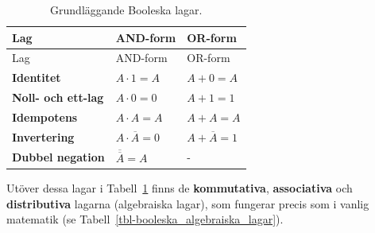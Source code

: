 \documentclass[
  swedish,
  letterpaper,
  oneside,
  openany]{book}
\begin{document}
\begin{longtable}[]{@{}
  >{\raggedright\arraybackslash}p{}
  >{\raggedright\arraybackslash}p{}
  >{\raggedright\arraybackslash}p{}@{}}
\caption{Grundläggande Booleska
lagar.}\label{tbl-booleska_grundlagar}\tabularnewline
\toprule\noalign{}
\begin{minipage}[b]{\linewidth}\raggedright
Lag
\end{minipage} & \begin{minipage}[b]{\linewidth}\raggedright
AND-form
\end{minipage} & \begin{minipage}[b]{\linewidth}\raggedright
OR-form
\end{minipage} \\
\midrule\noalign{}
\endfirsthead
\toprule\noalign{}
\begin{minipage}[b]{\linewidth}\raggedright
Lag
\end{minipage} & \begin{minipage}[b]{\linewidth}\raggedright
AND-form
\end{minipage} & \begin{minipage}[b]{\linewidth}\raggedright
OR-form
\end{minipage} \\
\midrule\noalign{}
\endhead
\bottomrule\noalign{}
\endlastfoot
\textbf{Identitet} & \(A \cdot 1 = A\) & \(A + 0 = A\) \\
\textbf{Noll- och ett-lag} & \(A \cdot 0 = 0\) & \(A + 1 = 1\) \\
\textbf{Idempotens} & \(A \cdot A = A\) & \(A + A = A\) \\
\textbf{Invertering} & \(A \cdot \overline{A} = 0\) &
\(A + \overline{A} = 1\) \\
\textbf{Dubbel negation} & \(\overline{\overline{A}} = A\) & - \\
\end{longtable}

Utöver dessa lagar i Tabell~\ref{tbl-booleska_grundlagar} finns de
\textbf{kommutativa}, \textbf{associativa} och \textbf{distributiva}
lagarna (algebraiska lagar), som fungerar precis som i vanlig matematik
(se Tabell~\ref{tbl-booleska_algebraiska_lagar}).
\end{document}
